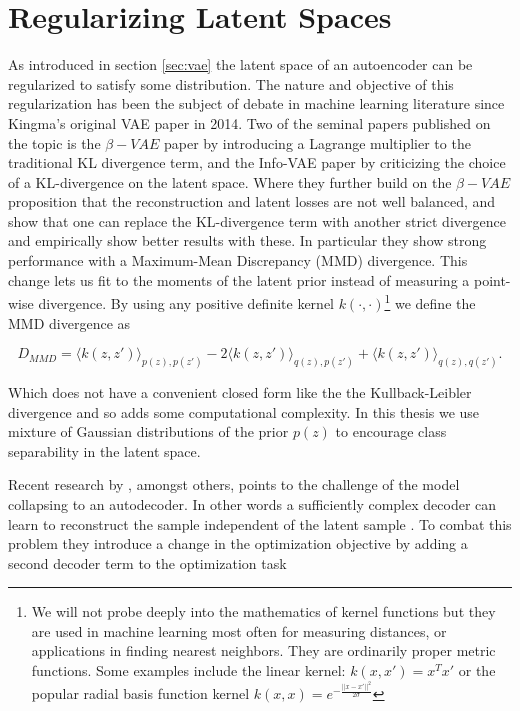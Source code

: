 \section{Regularizing Latent Spaces}\label{sec:latent}

As introduced in section \ref{sec:vae} the latent space of an autoencoder can be regularized to satisfy some distribution. The nature and objective of this regularization has been the subject of debate in machine learning literature since Kingma's original VAE paper in 2014. Two of the seminal papers published on the topic is the $\beta-VAE$ paper by \citet{Higgins2017} introducing a Lagrange multiplier to the traditional KL divergence term, and the Info-VAE paper by \citet{Zhao} criticizing the choice of a KL-divergence on the latent space. Where they further build on the $\beta-VAE$ proposition that the reconstruction and latent losses are not well balanced, and show that one can replace the KL-divergence term with another strict divergence and empirically show better results with these. In particular they show strong performance with a Maximum-Mean Discrepancy (MMD) divergence. This change lets us fit to the moments of the latent prior instead of measuring a point-wise divergence. By using any positive definite kernel $k(\cdot, \cdot)$\footnote{We will not probe deeply into the mathematics of kernel functions but they are used in machine learning most often for measuring distances, or applications in finding nearest neighbors. They are ordinarily proper metric functions. Some examples include the linear kernel: $k(x, x') = x^Tx'$ or the popular radial basis function kernel $k(x, x)=e^{-\frac{||x - x'||^2}{2\sigma}}$}  we define the MMD divergence as  

\begin{equation}\label{eq:mmd}
D_{MMD} = \langle k(z, z')\rangle_{p(z), p(z')} - 2 \langle k(z, z')\rangle_{q(z), p(z')} + \langle k(z, z')\rangle_{q(z), q(z')}.
\end{equation}

\noindent Which does not have a convenient closed form like the the Kullback-Leibler divergence and so adds some computational complexity. In this thesis we use mixture of Gaussian distributions of the prior $p(z)$ to encourage class separability in the latent space.

Recent research by \citet{Seybold2019}, amongst others, points to the challenge of the model collapsing to an autodecoder. In other words a sufficiently complex decoder can learn to reconstruct the sample independent of the latent sample \cite{Seybold2019}. To combat this problem they introduce a change in the optimization objective by adding a second decoder term to the optimization task

